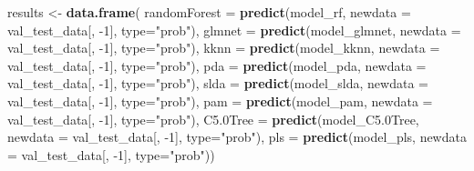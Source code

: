 \documentclass[]{book}
\newenvironment{Shaded}{\begin{snugshade}}{\end{snugshade}}
\newcommand{\DataTypeTok}[1]{\textcolor[rgb]{0.13,0.29,0.53}{#1}}
\newcommand{\DecValTok}[1]{\textcolor[rgb]{0.00,0.00,0.81}{#1}}
\newcommand{\FloatTok}[1]{\textcolor[rgb]{0.00,0.00,0.81}{#1}}
\newcommand{\KeywordTok}[1]{\textcolor[rgb]{0.13,0.29,0.53}{\textbf{#1}}}
\newcommand{\NormalTok}[1]{#1}
\newcommand{\StringTok}[1]{\textcolor[rgb]{0.31,0.60,0.02}{#1}}
\begin{document}
\begin{Shaded}
\begin{Highlighting}[]
\NormalTok{results <-}\StringTok{ }\KeywordTok{data.frame}\NormalTok{(}
  \DataTypeTok{randomForest =} \KeywordTok{predict}\NormalTok{(model_rf, }\DataTypeTok{newdata =}\NormalTok{ val_test_data[, }\DecValTok{-1}\NormalTok{], }\DataTypeTok{type=}\StringTok{"prob"}\NormalTok{),}
  \DataTypeTok{glmnet =} \KeywordTok{predict}\NormalTok{(model_glmnet, }\DataTypeTok{newdata =}\NormalTok{ val_test_data[, }\DecValTok{-1}\NormalTok{], }\DataTypeTok{type=}\StringTok{"prob"}\NormalTok{),}
  \DataTypeTok{kknn =} \KeywordTok{predict}\NormalTok{(model_kknn, }\DataTypeTok{newdata =}\NormalTok{ val_test_data[, }\DecValTok{-1}\NormalTok{], }\DataTypeTok{type=}\StringTok{"prob"}\NormalTok{),}
  \DataTypeTok{pda =} \KeywordTok{predict}\NormalTok{(model_pda, }\DataTypeTok{newdata =}\NormalTok{ val_test_data[, }\DecValTok{-1}\NormalTok{], }\DataTypeTok{type=}\StringTok{"prob"}\NormalTok{),}
  \DataTypeTok{slda =} \KeywordTok{predict}\NormalTok{(model_slda, }\DataTypeTok{newdata =}\NormalTok{ val_test_data[, }\DecValTok{-1}\NormalTok{], }\DataTypeTok{type=}\StringTok{"prob"}\NormalTok{),}
  \DataTypeTok{pam =} \KeywordTok{predict}\NormalTok{(model_pam, }\DataTypeTok{newdata =}\NormalTok{ val_test_data[, }\DecValTok{-1}\NormalTok{], }\DataTypeTok{type=}\StringTok{"prob"}\NormalTok{),}
  \DataTypeTok{C5.0Tree =} \KeywordTok{predict}\NormalTok{(model_C5}\FloatTok{.0}\NormalTok{Tree, }\DataTypeTok{newdata =}\NormalTok{ val_test_data[, }\DecValTok{-1}\NormalTok{], }\DataTypeTok{type=}\StringTok{"prob"}\NormalTok{),}
  \DataTypeTok{pls =} \KeywordTok{predict}\NormalTok{(model_pls, }\DataTypeTok{newdata =}\NormalTok{ val_test_data[, }\DecValTok{-1}\NormalTok{], }\DataTypeTok{type=}\StringTok{"prob"}\NormalTok{))}


\end{Highlighting}
\end{Shaded}
\end{document}
